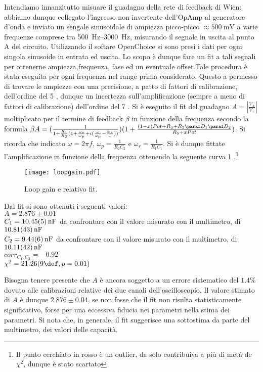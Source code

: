 Intendiamo innanzitutto misuare il guadagno della rete di feedback di Wien: abbiamo dunque collegato l'ingresso
non invertente dell'OpAmp al generatore d'onda e inviato un sengale sinusoidale di ampiezza picco-picco $\approx \SI{500}{\mV}$
a varie frequenze comprese tra \SIrange[range-phrase = \text{ e }]{500}{3000}{\Hz},
misurando il segnale in uscita al punto A del circuito. Utilizzando il softare OpenChoice si sono presi i dati per ogni singola sinusoide in entrata ed uscita. Lo scopo è dunque fare un fit a tali segnali per ottenerne ampiezza,frequenza, fase ed un eventuale offset.Tale procedura è stata eseguita per ogni frequenza nel range prima considerato. Questo a permesso di trovare le ampiezze con una precisione, a patto di fattori di calibrazione, dell'ordine del 5 \textperthousand , dunque un incertezza sull'amplificazione (sempre a meno di fattori di calibrazione) dell'ordine del 7 \textperthousand.
Si è eseguito il fit del guadagno $A=\left | \frac{V_A}{V_+} \right | $ moltiplicato per il termine di feedback $\beta$ in funzione della frequenza secondo la formula $\beta A= (\frac{1}{1+\frac{R_1}{R_2}(1+\frac{\omega_s}{\omega_p}+i(\frac{\omega}{\omega_p}-\frac{\omega_s}{\omega} ))})(1 + \frac{(1-x)Pot+R_4+R_3 \paral D_1 \paral D_2}{R_5+xPot})$. Si ricorda che indicato $\omega=2 \pi f$, $\omega_p= \frac{1}{R_2C_2}$ e $\omega_s=\frac{1}{R_1C_1}$. Si è dunque fittate l'amplificazione in funzione della frequenza ottenendo la seguente curva \ref{f:lpgn} .\footnote{Il punto cerchiato in rosso è un outlier, da solo contribuiva a più di metà de $\chi^2$, dunque è stato scartato}


\begin{figure}[h]
	\centering
	\texttt{[image: loopgain.pdf]}
	\caption{Loop gain e relativo fit.}
	\label{f:lpgn}
\end{figure}

Dal fit si sono ottenuti i seguenti valori:\\
$A=2.876 \pm 0.01$\\
$C_1=\SI{10.45 \pm 0.05}{nF}$ da confrontare con il valore misurato con il multimetro, di $\SI{10.81\pm 0.43}{nF}$\\
$C_2=\SI{9.44\pm 0.06}{nF}$ da confrontare con il valore misurato con il multimetro, di $\SI{10.11\pm 0.42}{nF}$\\
$corr_{C_1, C_2}=-0.92$\\
$\chi^2=21.26 (9 \dof, p = 0.01)$

Bisogna tenere presente che $A$ è ancora soggetto a un errore sistematico del $1.4 \%$ dovuto alle calibrazioni relative dei due canali dell'oscilloscopio. Il valore stimato di $A$ è dunque $2.876 \pm 0.04$, se non fosse che il fit non risulta statisticamente significativo, forse per una eccessiva fiducia nei parametri nella stima dei parametri.
Si nota che, in generale, il fit suggerisce una sottostima da parte del multimetro, dei  valori delle capacità.  


